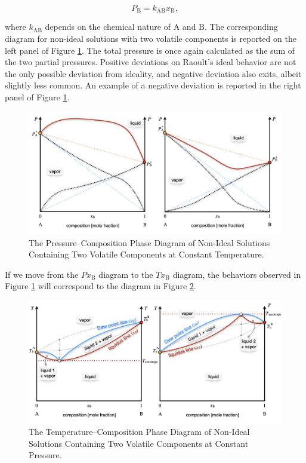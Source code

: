 \documentclass[
  9pt,
]{extbook}
\theoremstyle{definition}
\theoremstyle{definition}
\theoremstyle{definition}
\theoremstyle{remark}
\begin{document}
\begin{equation}
P_{\text{B}}=k_{\text{AB}} x_{\text{B}},
\label{eq:mc1}
\end{equation}

where \(k_{\text{AB}}\) depends on the chemical nature of \(\mathrm{A}\) and \(\mathrm{B}\). The corresponding diagram for non-ideal solutions with two volatile components is reported on the left panel of Figure \ref{fig:FigMC7}. The total pressure is once again calculated as the sum of the two partial pressures. Positive deviations on Raoult's ideal behavior are not the only possible deviation from ideality, and negative deviation also exits, albeit slightly less common. An example of a negative deviation is reported in the right panel of Figure \ref{fig:FigMC7}.

\begin{figure}

{\centering \includegraphics[width=0.8\linewidth]{./img/OEP_Figures.025} 

}

\caption{The Pressure–Composition Phase Diagram of Non-Ideal Solutions Containing Two Volatile Components at Constant Temperature.}\label{fig:FigMC7}
\end{figure}

If we move from the \(Px_{\text{B}}\) diagram to the \(Tx_{\text{B}}\) diagram, the behaviors observed in Figure \ref{fig:FigMC7} will correspond to the diagram in Figure \ref{fig:FigMC8}.

\begin{figure}

{\centering \includegraphics[width=0.8\linewidth]{./img/OEP_Figures.026} 

}

\caption{The Temperature–Composition Phase Diagram of Non-Ideal Solutions Containing Two Volatile Components at Constant Pressure.}\label{fig:FigMC8}
\end{figure}
\end{document}
